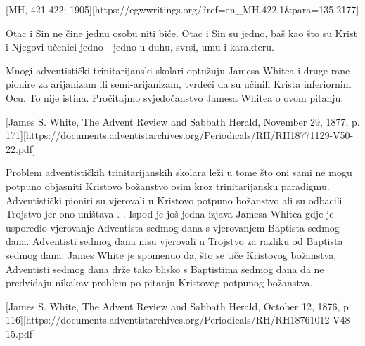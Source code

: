 [MH, 421 422; 1905][https://egwwritings.org/?ref=en\_MH.422.1&para=135.2177]

Otac i Sin ne čine jednu osobu niti biće. Otac i Sin su jedno, baš kao što su Krist i Njegovi učenici jedno—jedno u duhu, svrsi, umu i karakteru.

Mnogi adventistički trinitarijanski skolari optužuju Jamesa Whitea i druge rane pionire za arijanizam ili semi-arijanizam, tvrdeći da su učinili Krista inferiornim Ocu. To nije istina. Pročitajmo svjedočanstvo Jamesa Whitea o ovom pitanju.


[James S. White, The Advent Review and Sabbath Herald, November 29, 1877, p. 171][https://documents.adventistarchives.org/Periodicals/RH/RH18771129-V50-22.pdf]

Problem adventističkih trinitarijanskih skolara leži u tome što oni sami ne mogu potpuno objasniti Kristovo božanstvo osim kroz trinitarijansku paradigmu. Adventistički pioniri su vjerovali u Kristovo potpuno božanstvo ali su odbacili Trojstvo jer ono uništava . . Ispod je još jedna izjava Jamesa Whitea gdje je usporedio vjerovanje Adventista sedmog dana s vjerovanjem Baptista sedmog dana. Adventisti sedmog dana nisu vjerovali u Trojstvo za razliku od Baptista sedmog dana. James White je spomenuo da, što se tiče Kristovog božanstva, Adventisti sedmog dana drže tako blisko s Baptistima sedmog dana da ne predviđaju nikakav problem po pitanju Kristovog potpunog božanstva.

[James S. White, The Advent Review and Sabbath Herald, October 12, 1876, p. 116][https://documents.adventistarchives.org/Periodicals/RH/RH18761012-V48-15.pdf]

